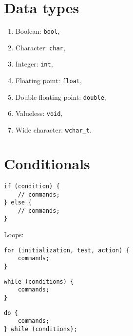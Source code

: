 \documentclass[a4paper, twoside, 8pt]{extarticle}
\newenvironment{enumx} {
	\begin{enumerate}[leftmargin=*]
	\setlength{\topsep}{0pt}
	\setlength{\itemsep}{0pt}
	\setlength{\parskip}{0pt}
	\setlength{\parsep}{0pt}
	}
{\end{enumerate}}
\begin{document}
\renewcommand{\footrulewidth}{0.4pt}
\begin{multicols*}{3}
\section{Data types}
\begin{enumx}
\item Boolean: \texttt{bool}, 
\item Character: \texttt{char}, 
\item Integer: \texttt{int}, 
\item Floating point: \texttt{float}, 
\item Double floating point: \texttt{double}, 
\item Valueless: \texttt{void}, 
\item Wide character: \texttt{wchar\_t}.
\end{enumx}

\section{Conditionals}

\begin{verbatim}
if (condition) {
	// commands;
} else {
	// commands;
}
\end{verbatim}
Loops:

\begin{verbatim}
for (initialization, test, action) {
	commands;
}
\end{verbatim}

\begin{verbatim}
while (conditions) {
	commands;
}
\end{verbatim}

\begin{verbatim}
do {
	commands;
} while (conditions);
\end{verbatim}

\end{multicols*}
\end{document}
